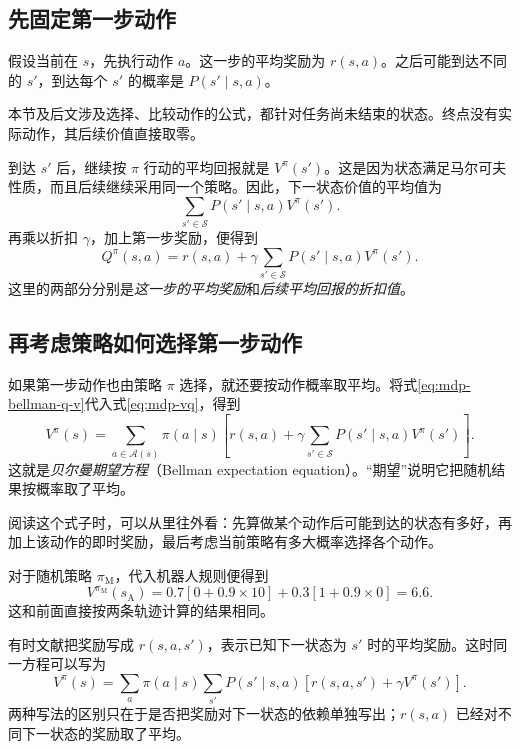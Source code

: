 \documentclass[UTF8,12pt,a4paper,fontset=fandol]{ctexart}
\begin{document}
\subsection{先固定第一步动作}

假设当前在 $s$，先执行动作 $a$。这一步的平均奖励为 $r(s,a)$。之后可能到达不同的 $s'$，到达每个 $s'$ 的概率是 $P(s'\mid s,a)$。

本节及后文涉及选择、比较动作的公式，都针对任务尚未结束的状态。终点没有实际动作，其后续价值直接取零。

到达 $s'$ 后，继续按 $\pi$ 行动的平均回报就是 $V^\pi(s')$。这是因为状态满足马尔可夫性质，而且后续继续采用同一个策略。因此，下一状态价值的平均值为
\[
  \sum_{s'\in\mathcal S}P(s'\mid s,a)V^\pi(s').
\]
再乘以折扣 $\gamma$，加上第一步奖励，便得到
\begin{equation}
  Q^\pi(s,a)
  =r(s,a)+\gamma\sum_{s'\in\mathcal S}P(s'\mid s,a)V^\pi(s').
  \label{eq:mdp-bellman-q-v}
\end{equation}
这里的两部分分别是\emph{这一步的平均奖励}和\emph{后续平均回报的折扣值}。

\subsection{再考虑策略如何选择第一步动作}

如果第一步动作也由策略 $\pi$ 选择，就还要按动作概率取平均。将式\eqref{eq:mdp-bellman-q-v}代入式\eqref{eq:mdp-vq}，得到
\begin{equation}
  V^\pi(s)=\sum_{a\in\mathcal A(s)}\pi(a\mid s)
  \left[r(s,a)+\gamma\sum_{s'\in\mathcal S}P(s'\mid s,a)V^\pi(s')\right].
  \label{eq:mdp-bellman-v}
\end{equation}
这就是\emph{贝尔曼期望方程}（Bellman expectation equation）。“期望”说明它把随机结果按概率取了平均。

阅读这个式子时，可以从里往外看：先算做某个动作后可能到达的状态有多好，再加上该动作的即时奖励，最后考虑当前策略有多大概率选择各个动作。

对于随机策略 $\pi_{\mathrm M}$，代入机器人规则便得到
\[
  V^{\pi_{\mathrm M}}(s_{\mathrm A})
  =0.7[0+0.9\times10]+0.3[1+0.9\times0]
  =6.6.
\]
这和前面直接按两条轨迹计算的结果相同。

有时文献把奖励写成 $r(s,a,s')$，表示已知下一状态为 $s'$ 时的平均奖励。这时同一方程可以写为
\[
  V^\pi(s)=\sum_a\pi(a\mid s)\sum_{s'}P(s'\mid s,a)
  [r(s,a,s')+\gamma V^\pi(s')].
\]
两种写法的区别只在于是否把奖励对下一状态的依赖单独写出；$r(s,a)$ 已经对不同下一状态的奖励取了平均。
\end{document}
